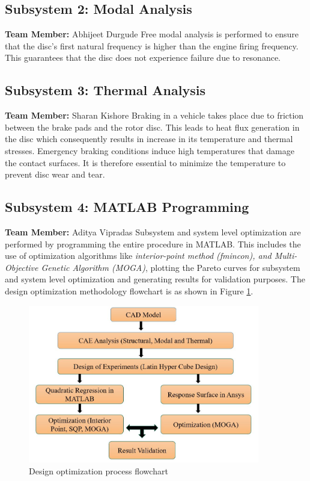 \documentclass[12pt]{article}
\begin{document}
\subsection{\textbf{Subsystem 2:} Modal Analysis}
\textbf{Team Member:} Abhijeet Durgude
\newline\newline
Free modal analysis is performed to ensure that the disc's first natural frequency is higher than the engine firing frequency. This guarantees that the disc does not experience failure due to resonance.  
\subsection{\textbf{Subsystem 3:} Thermal Analysis}
\textbf{Team Member:} Sharan Kishore
\newline\newline
Braking in a vehicle takes place due to friction between the brake pads and the rotor disc. This leads to heat flux generation in the disc which consequently results in increase in its temperature and thermal stresses. Emergency braking conditions induce high temperatures that damage the contact surfaces. It is therefore essential to minimize the temperature to prevent disc wear and tear.
\subsection{\textbf{Subsystem 4:} MATLAB Programming}
\textbf{Team Member:} Aditya Vipradas
\newline\newline
Subsystem and system level optimization are performed by programming the entire procedure in MATLAB. This includes the use of optimization algorithms like \emph{interior-point method (fmincon), and Multi-Objective Genetic Algorithm (MOGA)}, plotting the Pareto curves for subsystem and system level optimization and generating results for validation purposes.\newline\newline
The design optimization methodology flowchart is as shown in Figure \ref{fig1}. 
\begin{figure}[H]
\begin{center}
\includegraphics[width=0.9\textwidth]{flow.jpg}
\caption{Design optimization process flowchart}
\label{fig1}
\end{center}
\end{figure}
\end{document}
